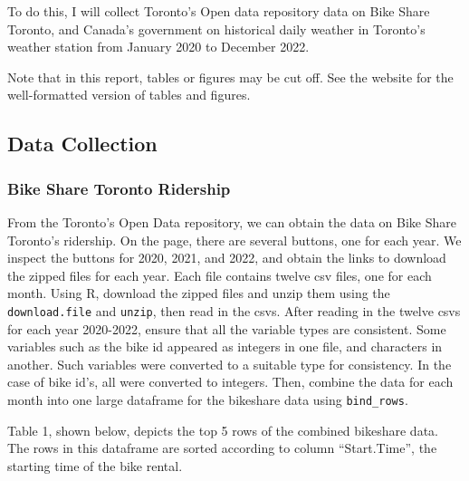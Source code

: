 \documentclass[
]{article}
\begin{document}
To do this, I will collect Toronto's Open data repository data on Bike
Share Toronto, and Canada's government on historical daily weather in
Toronto's weather station from January 2020 to December 2022.

Note that in this report, tables or figures may be cut off. See the
website for the well-formatted version of tables and figures.

\hypertarget{data-collection}{%
\subsection{Data Collection}\label{data-collection}}

\hypertarget{bike-share-toronto-ridership}{%
\subsubsection{Bike Share Toronto
Ridership}\label{bike-share-toronto-ridership}}

From the Toronto's Open Data repository, we can obtain the data on Bike
Share Toronto's ridership. On the page, there are several buttons, one
for each year. We inspect the buttons for 2020, 2021, and 2022, and
obtain the links to download the zipped files for each year. Each file
contains twelve csv files, one for each month. Using R, download the
zipped files and unzip them using the \texttt{download.file} and
\texttt{unzip}, then read in the csvs. After reading in the twelve csvs
for each year 2020-2022, ensure that all the variable types are
consistent. Some variables such as the bike id appeared as integers in
one file, and characters in another. Such variables were converted to a
suitable type for consistency. In the case of bike id's, all were
converted to integers. Then, combine the data for each month into one
large dataframe for the bikeshare data using \texttt{bind\_rows}.

Table 1, shown below, depicts the top 5 rows of the combined bikeshare
data. The rows in this dataframe are sorted according to column
``Start.Time'', the starting time of the bike rental.
\end{document}
